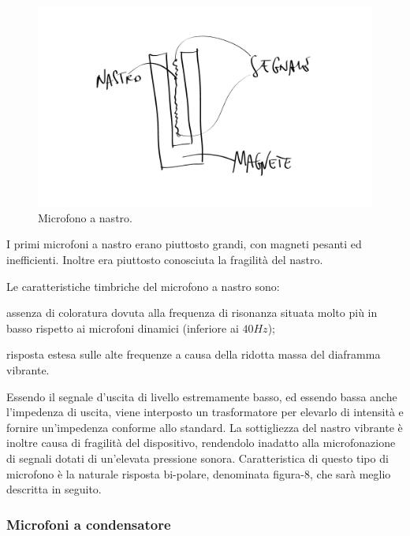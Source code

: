 \begin{refsection}
\begin{figure}[h]
\centering
\includegraphics[width=0.99\columnwidth]{CAPITOLI/0200/img/mic-nastro.png}
\caption[]{Microfono a nastro.}
\label{mic:nastro}
\end{figure}

I primi microfoni a nastro erano piuttosto grandi, con magneti pesanti ed
inefficienti. Inoltre era piuttosto conosciuta la fragilità del nastro.

Le caratteristiche timbriche del microfono a nastro sono:

\begin{compactitem}
  \item assenza di coloratura dovuta alla frequenza di risonanza situata molto
  più in basso rispetto ai microfoni dinamici (inferiore ai $40Hz$);
  \item risposta estesa sulle alte frequenze a causa della ridotta massa del
  diaframma vibrante.
\end{compactitem}

Essendo il segnale d’uscita di livello estremamente basso,
ed essendo bassa anche l’impedenza di uscita, viene interposto un trasformatore
per elevarlo di intensità e fornire un’impedenza conforme allo standard.
La sottigliezza del nastro vibrante è inoltre causa di fragilità del dispositivo,
rendendolo inadatto alla microfonazione di segnali dotati di un’elevata pressione
sonora. Caratteristica di questo tipo di microfono è la naturale risposta bi-polare,
denominata figura-8, che sarà meglio descritta in seguito.

\subsubsection{Microfoni a condensatore}


\end{refsection}
